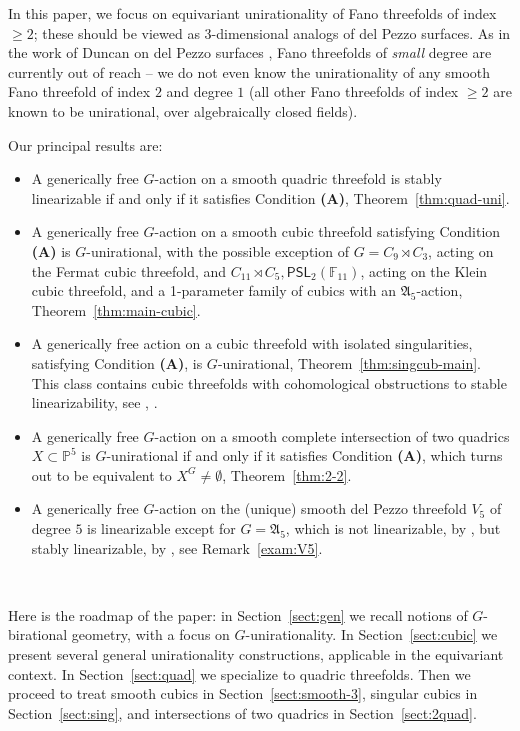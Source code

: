 \documentclass[12pt,reqno]{amsart}
\theoremstyle{plain}
\theoremstyle{remark}
\theoremstyle{definition}
\numberwithin{equation}{section}
\def\fA{{\mathfrak A}}
\def\bP{{\mathbb P}}
\def\bF{{\mathbb F}}
\def\PSL{\mathsf{PSL}}
\begin{document}
In this paper, we focus on equivariant unirationality of Fano threefolds of index $\ge 2$; these should be viewed as 3-dimensional analogs of del Pezzo surfaces. As in the work of Duncan on del Pezzo surfaces \cite{Duncan}, Fano threefolds of {\em small} degree are currently out of reach -- we do not even know the unirationality of any smooth Fano threefold of index $2$ and degree $1$ (all other Fano threefolds of index $\ge 2$ are known to be unirational, over algebraically closed fields). 

Our principal results are: 
\begin{itemize}
    \item A generically free $G$-action on a smooth quadric threefold is stably linearizable if and only if it satisfies Condition {\bf (A)}, Theorem~\ref{thm:quad-uni}. 
    \item A generically free $G$-action on a smooth cubic threefold satisfying Condition {\bf (A)} is $G$-unirational, with the possible exception of $G=C_9\rtimes C_3$, acting on the Fermat cubic threefold, 
  and $C_{11}\rtimes C_{5}, \PSL_2(\bF_{11})$, acting on the Klein cubic threefold, and a 1-parameter family of cubics with an $\fA_5$-action,    
    Theorem~\ref{thm:main-cubic}. 
    \item A generically free action on a cubic threefold with isolated singularities,  
    satisfying Condition {\bf (A)}, is $G$-unirational, Theorem~\ref{thm:singcub-main}.
    This class contains cubic threefolds with cohomological obstructions to stable linearizability, see \cite{CTZ-cubic}, \cite{CMTZ}. 
     \item A generically free $G$-action on a smooth  complete intersection of two quadrics $X\subset \bP^5$ is $G$-unirational if and only if it satisfies Condition {\bf (A)}, which turns out to be  equivalent to $X^G\neq \emptyset$, Theorem~\ref{thm:2-2}. 
     \item A generically free $G$-action on the (unique) smooth del Pezzo threefold $V_5$ of degree $5$ is linearizable except for $G=\fA_5$, which is not linearizable, by \cite{CS}, but stably linearizable, by \cite[Example 7]{BBT-der}, see Remark~\ref{exam:V5}.
\end{itemize}


\ 


Here is the roadmap of the paper: in Section~\ref{sect:gen} we recall notions of $G$-birational geometry, with a focus on $G$-unirationality. In Section~\ref{sect:cubic} we present several general unirationality constructions, applicable in the equivariant context. In Section~\ref{sect:quad} we specialize to quadric threefolds. Then we proceed to treat
smooth cubics in Section~\ref{sect:smooth-3}, singular cubics in Section~\ref{sect:sing}, and 
intersections of two quadrics in Section~\ref{sect:2quad}.
\end{document}
